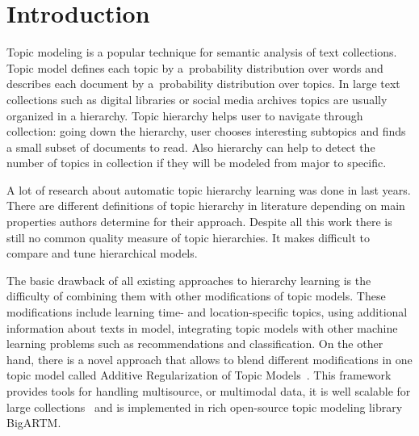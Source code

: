 \documentclass[12pt, twoside]{article}
\begin{document}

\maketitle
\linenumbers

\newcommand{\norm}{\mathop{\text{norm}}}

\section{Introduction}
\noindent %
Topic modeling is a popular technique for semantic analysis of text collections. Topic model defines each topic by a~probability distribution over words and describes each document by a~probability distribution over topics. 
In large text collections such as digital libraries or social media archives topics are usually organized in a hierarchy. Topic hierarchy helps user to navigate through collection: going down the hierarchy, user chooses interesting subtopics and finds a small subset of documents to read. Also hierarchy can help to detect the number of topics in collection if they will be modeled from major to specific.

A lot of research about automatic topic hierarchy learning was done in last years. There are different definitions of topic hierarchy in literature depending on main properties authors determine for their approach. Despite all this work there is still no common quality measure of topic hierarchies. It makes difficult to compare and tune hierarchical models.  

The basic drawback of all existing approaches to hierarchy learning is the difficulty of combining them with other modifications of topic models. These modifications include learning time- and location-specific topics, using additional information about texts in model, integrating topic models with other machine learning problems such as recommendations and classification. On the other hand, there is a novel approach that allows to blend different modifications in one topic model called Additive Regularization of Topic Models~\cite{ARTM}. This framework provides tools for handling multisource, or multimodal data, 
it is well scalable for large collections~\cite{BigARTM} and is implemented in rich open-source topic modeling library BigARTM.
\end{document}
